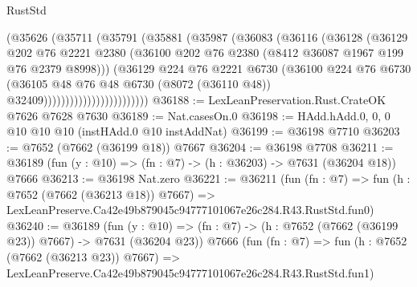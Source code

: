 \begin{lexlean}{RustStd}
\begin{coremodule}
                              (@35626
                                (@35711
                                  (@35791
                                    (@35881
                                      (@35987
                                        (@36083
                                          (@36116
                                            (@36128
                                              (@36129
                                                @202
                                                @76
                                                @2221
                                                @2380
                                                (@36100
                                                  @202
                                                  @76
                                                  @2380
                                                  (@8412 @36087 @1967 @199 @76 @2379 @8998)))
                                              (@36129
                                                @224
                                                @76
                                                @2221
                                                @6730
                                                (@36100
                                                  @224
                                                  @76
                                                  @6730
                                                  (@36105
                                                    @48
                                                    @76
                                                    @48
                                                    @6730
                                                    (@8072 (@36110 @48))
                                                    @32409))))))))))))))))))))))))
@36188 := LexLeanPreservation.Rust.CrateOK @7626 @7628 @7630
@36189 := Nat.casesOn.{0}
@36198 := HAdd.hAdd.{0, 0, 0} @10 @10 @10 (instHAdd.{0} @10 instAddNat)
@36199 := @36198 @7710
@36203 := @7652 (@7662 (@36199 @18)) @7667
@36204 := @36198 @7708
@36211 := @36189 (fun (y : @10) => (fn : @7) -> (h : @36203) -> @7631 (@36204 @18)) @7666
@36213 := @36198 Nat.zero
@36221 := @36211
    (fun (fn : @7) =>
    fun (h : @7652 (@7662 (@36213 @18)) @7667) =>
    LexLeanPreserve.Ca42e49b879045c94777101067e26c284.R43.RustStd.fun0)
@36240 := @36189
    (fun (y : @10) => (fn : @7) -> (h : @7652 (@7662 (@36199 @23)) @7667) -> @7631 (@36204 @23))
    @7666
    (fun (fn : @7) =>
    fun (h : @7652 (@7662 (@36213 @23)) @7667) =>
    LexLeanPreserve.Ca42e49b879045c94777101067e26c284.R43.RustStd.fun1)

\end{coremodule}
\end{lexlean}
